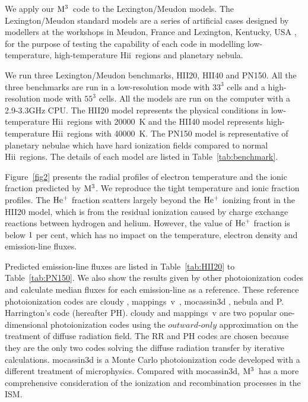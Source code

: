 \documentclass[twocolumn]{aastex62}
\newcommand{\newcode}{{$\rm M^3$}}
\newcommand{\mappings}{{\sc mappings~v}}
\newcommand{\hiireg}{{H{\sc ii}}}
\begin{document}
\begin{CJK*}{UTF8}{gbsn}


We apply our \newcode\ code to the Lexington/Meudon models.
The Lexington/Meudon standard models are a series of artificial cases designed by modellers at the workshops in Meudon, France \citep{Pequignot-1986} and Lexington, Kentucky, USA \citep{Ferland-1995}, for the purpose of testing the capability of each code in modelling low-temperature, high-temperature \hiireg\ regions and planetary nebula. 

We run three Lexington/Meudon benchmarks, HII20, HII40 and PN150.
All the three benchmarks are run in a low-resolution mode with $33^3$ cells and a high-resolution mode with $55^3$ cells.
All the models are run on the computer with a 2.9-3.3GHz CPU.
The HII20 model represents the physical conditions in low-temperature \hiireg\ regions with 20000~K and the HII40 model represents high-temperature \hiireg\ regions with 40000~K.
The PN150 model is representative of planetary nebulae which have hard ionization fields compared to normal \hiireg\ regions.
The details of each model are listed in Table~\ref{tab:benchmark}.

Figure~\ref{fig2} presents the radial profiles of electron temperature and the ionic fraction predicted by \newcode.
We reproduce the tight temperature and ionic fraction profiles.
The $\rm He^{+}$ fraction scatters largely beyond the $\rm He^{+}$ ionizing front in the HII20 model, which is from the residual ionization caused by charge exchange reactions between hydrogen and helium. 
However, the value of $\rm He^{+}$ fraction is below $\rm 1$ per cent, which has no impact on the temperature, electron density and emission-line fluxes.

Predicted emission-line fluxes are listed in Table~\ref{tab:HII20} to Table~\ref{tab:PN150}. 
We also show the results given by other photoionization codes and calculate median fluxes for each emission-line as a reference.
These reference photoionization codes are {\sc cloudy} \citep[][hereafter GF]{Ferland-1995}, \mappings\ \citep[][hereafter RS]{Sutherland-1993}, {\sc mocassin3d} \citep[][hereafter BE]{Ercolano-2003}, {\sc nebula} \citep[][hereafter RR]{Rubin-1991} and P. Harrington's code (hereafter PH).
{\sc cloudy} and {\mappings} are two popular one-dimensional photoionization codes using the $outward$-$only$ approximation on the treatment of diffuse radiation field.
The RR and PH codes are chosen because they are the only two codes solving the diffuse radiation transfer by iterative calculations.
{\sc mocassin3d} is a Monte Carlo photoionization code developed with a different treatment of microphysics. 
Compared with {\sc mocassin3d}, \newcode\ has a more comprehensive consideration of the ionization and recombination processes in the ISM.


\end{CJK*}
\end{document}
